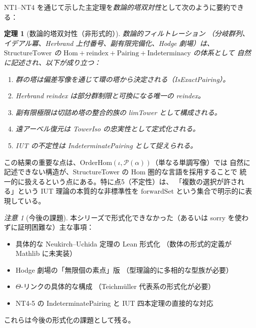 \documentclass[a4paper,11pt]{ltjsarticle}
\theoremstyle{definition}
\theoremstyle{plain}
\newtheorem{theorem}[definition]{定理}
\theoremstyle{remark}
\newtheorem{remark}[definition]{注意}
\newcommand{\Hom}{\mathrm{Hom}}
\begin{document}
NT1--NT4 を通じて示した主定理を\emph{数論的塔双対性}として次のように要約できる：

\begin{theorem}[数論的塔双対性（非形式的）]
数論的フィルトレーション
（分岐群列、イデアル冪、Herbrand 上付番号、副有限完備化、Hodge 劇場）は、
$\mathrm{StructureTower}$ の
$\Hom + \mathrm{reindex} + \mathrm{Pairing} + \mathrm{Indeterminacy}$ の体系として
自然に記述され、以下が成り立つ：
\begin{enumerate}
  \item 群の塔は偏差写像を通じて環の塔から決定される（IsExactPairing）。
  \item Herbrand reindex は部分群制限と可換になる唯一の reindex。
  \item 副有限極限は切詰め塔の整合的族の limTower として構成される。
  \item 遠アーベル復元は TowerIso の忠実性として定式化される。
  \item IUT の不定性は IndeterminatePairing として捉えられる。
\end{enumerate}
\end{theorem}

\begin{mathinsight}
この結果の重要な点は、$\mathrm{OrderHom}(\iota, \mathcal{P}(\alpha))$（単なる単調写像）では
自然に記述できない構造が、StructureTower の Hom 圏的な言語を採用することで
統一的に扱えるという点にある。特に点5（不定性）は、
「複数の選択が許される」という IUT 理論の本質的な非標準性を
$\mathrm{forwardSet}$ という集合で明示的に表現している。
\end{mathinsight}

\begin{remark}[今後の課題]
本シリーズで形式化できなかった（あるいは sorry を使わずに証明困難な）主な事項：
\begin{itemize}
  \item 具体的な Neukirch--Uchida 定理の Lean 形式化
    （数体の形式的定義が Mathlib に未実装）
  \item Hodge 劇場の「無限個の素点」版
    （型理論的に多相的な型族が必要）
  \item $\Theta$-リンクの具体的な構成
    （Teichmüller 代表系の形式化が必要）
  \item NT4-5 の IndeterminatePairing と IUT 四本定理の直接的な対応
\end{itemize}
これらは今後の形式化の課題として残る。
\end{remark}

\end{document}
